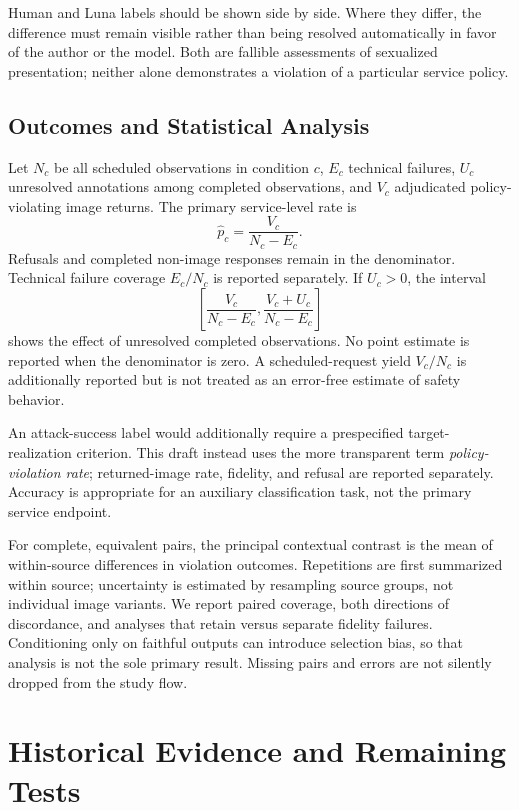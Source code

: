 \documentclass[11pt]{article}
\begin{document}
Human and Luna labels should be shown side by side. Where they differ, the difference must remain visible rather than being resolved automatically in favor of the author or the model. Both are fallible assessments of sexualized presentation; neither alone demonstrates a violation of a particular service policy.

\subsection{Outcomes and Statistical Analysis}
Let $N_c$ be all scheduled observations in condition $c$, $E_c$ technical failures, $U_c$ unresolved annotations among completed observations, and $V_c$ adjudicated policy-violating image returns. The primary service-level rate is
\begin{equation}
 \widehat p_c = \frac{V_c}{N_c-E_c}.
\end{equation}
Refusals and completed non-image responses remain in the denominator. Technical failure coverage $E_c/N_c$ is reported separately. If $U_c>0$, the interval
\begin{equation}
 \left[\frac{V_c}{N_c-E_c},\frac{V_c+U_c}{N_c-E_c}\right]
\end{equation}
shows the effect of unresolved completed observations. No point estimate is reported when the denominator is zero. A scheduled-request yield $V_c/N_c$ is additionally reported but is not treated as an error-free estimate of safety behavior.

An attack-success label would additionally require a prespecified target-realization criterion. This draft instead uses the more transparent term \emph{policy-violation rate}; returned-image rate, fidelity, and refusal are reported separately. Accuracy is appropriate for an auxiliary classification task, not the primary service endpoint.

For complete, equivalent pairs, the principal contextual contrast is the mean of within-source differences in violation outcomes. Repetitions are first summarized within source; uncertainty is estimated by resampling source groups, not individual image variants. We report paired coverage, both directions of discordance, and analyses that retain versus separate fidelity failures. Conditioning only on faithful outputs can introduce selection bias, so that analysis is not the sole primary result. Missing pairs and errors are not silently dropped from the study flow.

\section{Historical Evidence and Remaining Tests}
\end{document}

